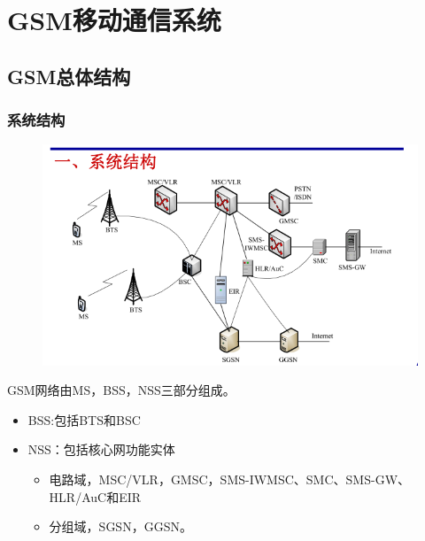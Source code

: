 \chapter{GSM移动通信系统}
\section{GSM总体结构}
\subsection{系统结构}
\begin{figure}[htbp]
	\centering
	\includegraphics[width=0.7\linewidth]{figures/screenshot003}
	\caption{}
	\label{fig:screenshot003}
\end{figure}
GSM网络由MS，BSS，NSS三部分组成。
\begin{itemize}
	\item BSS:包括BTS和BSC
	\item NSS：包括核心网功能实体
	\begin{itemize}
		\item 电路域，MSC/VLR，GMSC，SMS-IWMSC、SMC、SMS-GW、HLR/AuC和EIR
		\item 分组域，SGSN，GGSN。
	\end{itemize}
\end{itemize}
